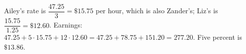 Ailey's rate is $\dfrac{47.25}3=\$15.75$ per hour, which is also Zander's; Liz's is $\dfrac{15.75}{1.25}=\$12.60$. Earnings: $47.25+5\cdot15.75+12\cdot12.60=47.25+78.75+151.20=277.20$. Five percent is $\boxed{\$13.86}$.
